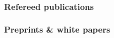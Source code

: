 \documentclass[12pt,letterpaper]{article}
\begin{document}
\subsubsection{Refereed publications}
\begin{list}{}{\cvlist}
  
\end{list}

\subsubsection{Preprints \& white papers}
\begin{list}{}{\cvlist}
  
\end{list}
\fi
\end{document}
